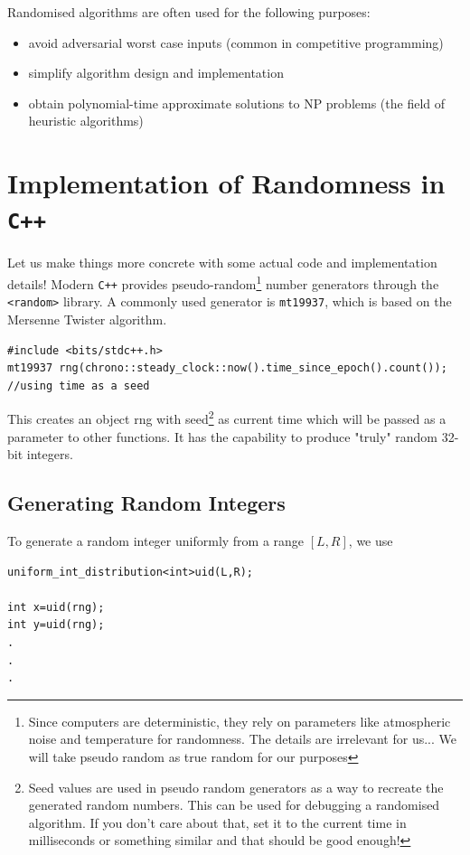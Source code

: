 \documentclass[11pt,openany]{book}
\begin{document}
\vspace{0.6em}
Randomised algorithms are often used for the following purposes:
\begin{itemize}
    \item avoid adversarial worst case inputs (common in competitive programming)
    \item simplify algorithm design and implementation
    \item obtain polynomial-time approximate solutions to NP problems (the field of heuristic algorithms)
\end{itemize}

\section{Implementation of Randomness in \texttt{C++}}

Let us make things more concrete with some actual code and implementation details!
Modern \texttt{C++} provides pseudo-random\footnote{Since computers are deterministic, they rely on parameters like atmospheric noise and temperature for randomness. The details are irrelevant for us... We will take pseudo random as true random for our purposes} number generators through the \texttt{<random>} library. A commonly used generator is \texttt{mt19937}, which is based on the Mersenne Twister algorithm.

\begin{verbatim}
#include <bits/stdc++.h>
mt19937 rng(chrono::steady_clock::now().time_since_epoch().count()); //using time as a seed
\end{verbatim}

This creates an object rng with seed\footnote{Seed values are used in pseudo random generators as a way to recreate the generated random numbers. This can be used for debugging a randomised algorithm. If you don't care about that, 
set it to the current time in milliseconds or something similar and that should be good enough!} as current time which will be passed as a parameter to other functions.
 It has the capability to produce "truly" random 32-bit integers.

\subsection*{Generating Random Integers}

To generate a random integer uniformly from a range \([L,R]\), we use

\begin{verbatim}
uniform_int_distribution<int>uid(L,R);

int x=uid(rng);
int y=uid(rng);
.
.
.
\end{verbatim}
\end{document}
